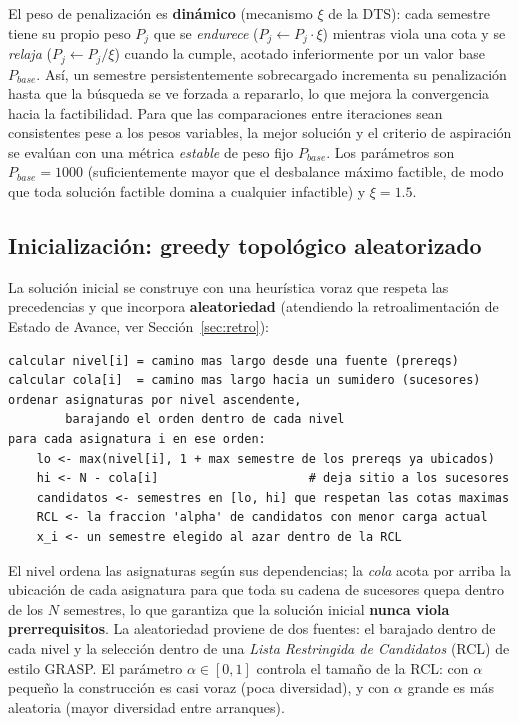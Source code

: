 \documentclass[letter, 10pt]{article}
\begin{document}
El peso de penalizaci\'on es \textbf{din\'amico} (mecanismo $\xi$ de la DTS): cada semestre tiene su propio peso $P_j$ que se \emph{endurece} ($P_j \leftarrow P_j \cdot \xi$) mientras viola una cota y se \emph{relaja} ($P_j \leftarrow P_j / \xi$) cuando la cumple, acotado inferiormente por un valor base $P_{base}$. As\'i, un semestre persistentemente sobrecargado incrementa su penalizaci\'on hasta que la b\'usqueda se ve forzada a repararlo, lo que mejora la convergencia hacia la factibilidad. Para que las comparaciones entre iteraciones sean consistentes pese a los pesos variables, la mejor soluci\'on y el criterio de aspiraci\'on se eval\'uan con una m\'etrica \emph{estable} de peso fijo $P_{base}$. Los par\'ametros son $P_{base}=1000$ (suficientemente mayor que el desbalance m\'aximo factible, de modo que toda soluci\'on factible domina a cualquier infactible) y $\xi=1.5$.

\subsection{Inicializaci\'on: greedy topol\'ogico aleatorizado}
La soluci\'on inicial se construye con una heur\'istica voraz que respeta las precedencias y que incorpora \textbf{aleatoriedad} (atendiendo la retroalimentaci\'on de Estado de Avance, ver Secci\'on~\ref{sec:retro}):

\begin{verbatim}
calcular nivel[i] = camino mas largo desde una fuente (prereqs)
calcular cola[i]  = camino mas largo hacia un sumidero (sucesores)
ordenar asignaturas por nivel ascendente,
        barajando el orden dentro de cada nivel
para cada asignatura i en ese orden:
    lo <- max(nivel[i], 1 + max semestre de los prereqs ya ubicados)
    hi <- N - cola[i]                     # deja sitio a los sucesores
    candidatos <- semestres en [lo, hi] que respetan las cotas maximas
    RCL <- la fraccion 'alpha' de candidatos con menor carga actual
    x_i <- un semestre elegido al azar dentro de la RCL
\end{verbatim}

\noindent El nivel ordena las asignaturas seg\'un sus dependencias; la \emph{cola} acota por arriba la ubicaci\'on de cada asignatura para que toda su cadena de sucesores quepa dentro de los $N$ semestres, lo que garantiza que la soluci\'on inicial \textbf{nunca viola prerrequisitos}. La aleatoriedad proviene de dos fuentes: el barajado dentro de cada nivel y la selecci\'on dentro de una \emph{Lista Restringida de Candidatos} (RCL) de estilo GRASP. El par\'ametro $\alpha \in [0,1]$ controla el tama\~no de la RCL: con $\alpha$ peque\~no la construcci\'on es casi voraz (poca diversidad), y con $\alpha$ grande es m\'as aleatoria (mayor diversidad entre arranques).
\end{document}
